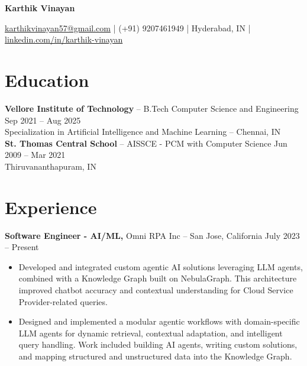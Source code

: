 \documentclass[11pt]{article}       %
\begin{document}
\begin{center}
\LARGE \textbf{Karthik Vinayan}
\end{center}

\vspace{5pt}

\centerline{\href{mailto:karthikvinayan57@gmail.com}{karthikvinayan57@gmail.com} | (+91) 9207461949 | Hyderabad, IN | \href{https://linkedin.com/in/karthik-vinayan}{linkedin.com/in/karthik-vinayan}}

\vspace{-10pt}

\section*{Education}
\noindent
\textbf{Vellore Institute of Technology} -- B.Tech Computer Science and Engineering \hfill \quad Sep 2021 -- Aug 2025 \\
Specialization in Artificial Intelligence and Machine Learning -- Chennai, IN \\
\noindent
\textbf{St. Thomas Central School} -- AISSCE - PCM with Computer Science \hfill \quad Jun 2009 -- Mar 2021 \\
Thiruvananthapuram, IN

\vspace{-6.5pt}

\section*{Experience}

\textbf{Software Engineer - AI/ML,} Omni RPA Inc -- San Jose, California \hfill July 2023 -- Present \\
\vspace{-9pt}
\begin{itemize}
  \item Developed and integrated custom agentic AI solutions leveraging LLM agents, combined with a Knowledge Graph built on NebulaGraph. This architecture improved chatbot accuracy and contextual understanding for Cloud Service Provider-related queries.
  \item Designed and implemented a modular agentic workflows with domain-specific LLM agents for dynamic retrieval, contextual adaptation, and intelligent query handling. Work included building AI agents, writing custom solutions, and mapping structured and unstructured data into the Knowledge Graph.
\end{itemize}
\end{document}
